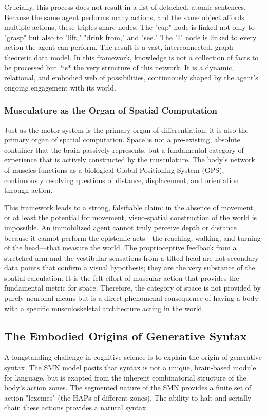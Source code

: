 Crucially, this process does not result in a list of detached, atomic sentences. Because the same agent performs many actions, and the same object affords multiple actions, these triples share nodes. The "cup" node is linked not only to "grasp" but also to "lift," "drink from," and "see." The "I" node is linked to every action the agent can perform. The result is a vast, interconnected, graph-theoretic data model. In this framework, knowledge is not a collection of facts to be processed but *is* the very structure of this network. It is a dynamic, relational, and embodied web of possibilities, continuously shaped by the agent's ongoing engagement with its world.

\subsubsection{Musculature as the Organ of Spatial Computation}
\label{ssubsec:muscles_space}
Just as the motor system is the primary organ of differentiation, it is also the primary organ of spatial computation. Space is not a pre-existing, absolute container that the brain passively represents, but a fundamental category of experience that is actively constructed by the musculature. The body's network of muscles functions as a biological Global Positioning System (GPS), continuously resolving questions of distance, displacement, and orientation through action.

This framework leads to a strong, falsifiable claim: in the absence of movement, or at least the potential for movement, visuo-spatial construction of the world is impossible. An immobilized agent cannot truly perceive depth or distance because it cannot perform the epistemic acts—the reaching, walking, and turning of the head—that measure the world. The proprioceptive feedback from a stretched arm and the vestibular sensations from a tilted head are not secondary data points that confirm a visual hypothesis; they are the very substance of the spatial calculation. It is the felt effort of muscular action that provides the fundamental metric for space. Therefore, the category of space is not provided by purely neuronal means but is a direct phenomenal consequence of having a body with a specific musculoskeletal architecture acting in the world.

\subsection{The Embodied Origins of Generative Syntax}
\label{subsec:syntax}
A longstanding challenge in cognitive science is to explain the origin of generative syntax. The SMN model posits that syntax is not a unique, brain-based module for language, but is exapted from the inherent combinatorial structure of the body's action zones. The segmented nature of the SMN provides a finite set of action "lexemes" (the HAPs of different zones). The ability to halt and serially chain these actions provides a natural syntax. 

